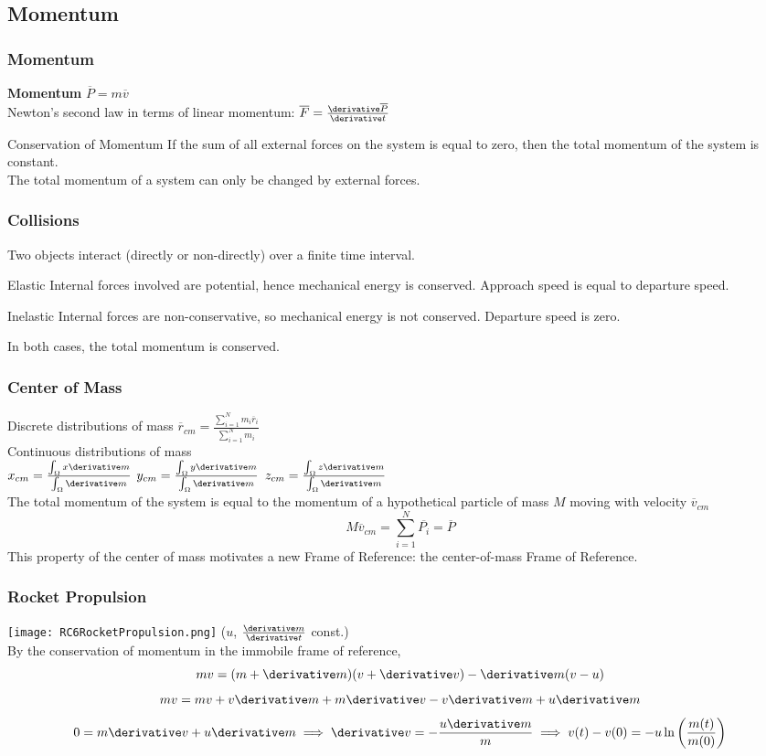 \subsection{Momentum}
\begin{frame}
\frametitle{Momentum}
\begin{definition}
\textbf{\alert{Momentum}} $\overline{P}=m\overline{v}$\\
Newton's second law in terms of linear momentum: $\overline F=\frac{\derivative\overline{P}}{\derivative t}$
\end{definition}
\begin{block}{Conservation of Momentum}
If the sum of all \alert{external} forces on the \alert{system} is equal to zero, then the total momentum of the system is constant.\\
The \alert{total} momentum of a system can only be changed by \alert{external} forces.
\end{block}
\end{frame}
\begin{frame}
\frametitle{Collisions}
Two objects interact (directly or non-directly) over a finite time interval.
\begin{block}{Elastic}
\alert{Internal} forces involved are \alert{potential}, hence mechanical energy is conserved. Approach speed is equal to departure speed.
\end{block}
\begin{block}{Inelastic}
\alert{Internal} forces are \alert{non-conservative}, so mechanical energy is not conserved. Departure speed is zero.
\end{block}
In \alert{both} cases, the total \alert{momentum} is conserved.
\end{frame}
\begin{frame}
\frametitle{Center of Mass}
Discrete distributions of mass $\overline{r}_{cm}=\frac{\sum_{i=1}^{N}m_i\overline{r}_i}{\sum_{i=1}^{N}m_i}$\\
Continuous distributions of mass \\$x_{cm}=\frac{\int_{\Omega}x\derivative m}{\int_{\Omega}\derivative m}$ $y_{cm}=\frac{\int_{\Omega}y\derivative m}{\int_{\Omega}\derivative m}$ $z_{cm}=\frac{\int_{\Omega}z\derivative m}{\int_{\Omega}\derivative m}$\\
The total momentum of the system is equal to the momentum of a hypothetical particle of mass $M$ moving with velocity $\overline{v}_{cm}$
\[M\overline{v}_{cm}=\sum_{i=1}^{N}\overline{P_i}=\overline P\]
This property of the center of mass motivates a new Frame of Reference: the center-of-mass Frame of Reference.
\end{frame}
\begin{frame}
\frametitle{Rocket Propulsion}
\texttt{[image: RC6RocketPropulsion.png]} ($u$, $\frac{\derivative m}{\derivative t}$ const.)\\
By the conservation of momentum in the immobile frame of reference,
\[mv=(m+\derivative m)(v+\derivative v)-\derivative m (v-u)\]
\[mv=mv+v\derivative m+m\derivative v-v\derivative m+u\derivative m\]
\[0=m\derivative v+u\derivative m\implies\derivative v=-\frac{u\derivative m}{m}\implies v(t)-v(0)=-u\ln\left(\frac{m(t)}{m(0)}\right)\]
\end{frame}
